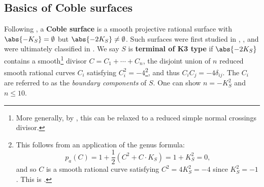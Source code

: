 \documentclass[../main.tex]{subfiles}
\begin{document}
\subsection{Basics of Coble surfaces}

\begin{remark}
Following \cite[\S 5.1]{DM19}, a \textbf{Coble surface} is a smooth projective rational surface with $\abs{-K_S} = \emptyset$ but $\abs{-2K_S} \neq \emptyset$. Such surfaces were first studied in \cite{Cob19}, \cite{Cob29}, and were ultimately classified in \cite{DZ99}. We say $S$ is \textbf{terminal of K3 type} if $\abs{-2K_S}$ contains a smooth\footnote{More generally, by \cite{DK24}, this can be relaxed to a reduced simple normal crossings divisor.} divisor $C = C_1 + \cdots + C_{n}$, the disjoint union of $n$ reduced smooth rational curves $C_i$ satisfying $C_i^2 = -4$\footnote{This follows from an application of the genus formula: $$p_{a}(C)=1+\frac{1}{2}\left(C^{2}+C \cdot K_{S}\right)=1+K_{S}^{2}=0,$$ and so $C$ is a smooth rational curve satisfying $C^2 = 4K_S^2 = -4$ since $K_S^2 = -1$. This is \cite[\S. 3.1]{CD12}.}, and thus $C_i C_j = -4\delta_{ij}$. The $C_i$ are referred to as the \textit{boundary components} of $S$. One can show $n = -K_S^2$ and $n\leq 10$.
\end{remark}
\end{document}
